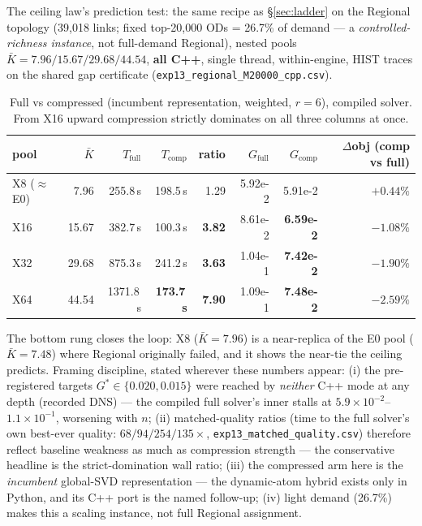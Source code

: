 \documentclass[11pt]{article}
\newcommand{\Kbar}{\bar K}
\begin{document}
The ceiling law's prediction test: the same recipe as \S\ref{sec:ladder} on the Regional
topology (39{,}018 links; fixed top-20{,}000 ODs = 26.7\% of demand --- a
\emph{controlled-richness instance}, not full-demand Regional), nested pools
$\Kbar=7.96/15.67/29.68/44.54$, \textbf{all C++}, single thread, within-engine, HIST
traces on the shared gap certificate (\texttt{exp13\_regional\_M20000\_cpp.csv}).

\begin{table}[h]\centering\small
\caption{Full vs compressed (incumbent representation, weighted, $r{=}6$), compiled
solver. From X16 upward compression strictly dominates on all three columns at once.}
\begin{tabular}{lrrrrrrr}
\toprule
pool & $\Kbar$ & $T_{\mathrm{full}}$ & $T_{\mathrm{comp}}$ & ratio &
$G_{\mathrm{full}}$ & $G_{\mathrm{comp}}$ & $\Delta$obj (comp vs full)\\
\midrule
X8 ($\approx$ E0) & 7.96 & 255.8\,s & 198.5\,s & 1.29 & 5.92e-2 & 5.91e-2 & $+0.44\%$\\
X16 & 15.67 & 382.7\,s & 100.3\,s & \textbf{3.82} & 8.61e-2 & \textbf{6.59e-2} & $\mathbf{-1.08\%}$\\
X32 & 29.68 & 875.3\,s & 241.2\,s & \textbf{3.63} & 1.04e-1 & \textbf{7.42e-2} & $\mathbf{-1.90\%}$\\
X64 & 44.54 & 1371.8\,s & \textbf{173.7\,s} & \textbf{7.90} & 1.09e-1 & \textbf{7.48e-2} & $\mathbf{-2.59\%}$\\
\bottomrule
\end{tabular}
\end{table}

\noindent The bottom rung closes the loop: X8 ($\Kbar=7.96$) is a near-replica of the E0
pool ($\Kbar=7.48$) where Regional originally failed, and it shows the near-tie the
ceiling predicts. Framing discipline, stated wherever these numbers appear:
(i) the pre-registered targets $G^\ast\in\{0.020,0.015\}$ were reached by \emph{neither}
C++ mode at any depth (recorded DNS) --- the compiled full solver's inner stalls at
$5.9\times10^{-2}$--$1.1\times10^{-1}$, worsening with $n$; (ii) matched-quality ratios
(time to the full solver's own best-ever quality: $68/94/254/135\times$,
\texttt{exp13\_matched\_quality.csv}) therefore reflect baseline weakness as much as
compression strength --- the conservative headline is the strict-domination wall ratio;
(iii) the compressed arm here is the \emph{incumbent} global-SVD representation --- the
dynamic-atom hybrid exists only in Python, and its C++ port is the named follow-up;
(iv) light demand (26.7\%) makes this a scaling instance, not full Regional assignment.
\end{document}

